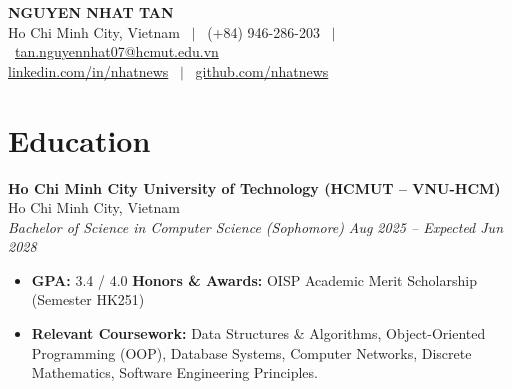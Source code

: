 \documentclass[11pt,a4paper]{article}
\begin{document}
\pagestyle{empty}

\begin{center}
    {\LARGE \textbf{NGUYEN NHAT TAN}} \\[3.5pt]
    \small
    Ho Chi Minh City, Vietnam \ $|$ \ (+84) 946-286-203 \ $|$ \ \href{mailto:tan.nguyennhat07@hcmut.edu.vn}{tan.nguyennhat07@hcmut.edu.vn} \\[2pt]
    \href{https://www.linkedin.com/in/nhatnews}{linkedin.com/in/nhatnews} \ $|$ \ \href{https://github.com/nhatnews}{github.com/nhatnews}
\end{center}

\vspace{-4pt}

\section*{Education}
\noindent
\textbf{Ho Chi Minh City University of Technology (HCMUT -- VNU-HCM)} \hfill Ho Chi Minh City, Vietnam \\
\textit{Bachelor of Science in Computer Science (Sophomore)} \hfill \textit{Aug 2025 -- Expected Jun 2028}
\begin{itemize}
    \item \textbf{GPA:} 3.4 / 4.0 \hfill \textbf{Honors \& Awards:} OISP Academic Merit Scholarship (Semester HK251)
    \item \textbf{Relevant Coursework:} Data Structures \& Algorithms, Object-Oriented Programming (OOP), Database Systems, Computer Networks, Discrete Mathematics, Software Engineering Principles.
\end{itemize}

\vspace{1pt}

\end{document}
